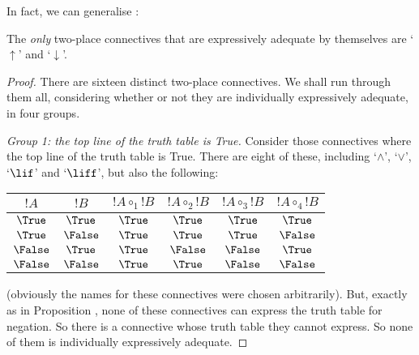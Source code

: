 \documentclass[../../../include/open-logic-section]{subfiles}
\begin{document}
In fact, we can generalise :
	\begin{thm}The \emph{only} two-place connectives that are expressively adequate by themselves are `$\uparrow$' and `$\downarrow$'. 
		\begin{proof}
			There are sixteen distinct two-place connectives. We shall run through them all, considering whether or not they are individually expressively adequate, in four groups. 
			
			\emph{Group 1: the top line of the truth table is True.} Consider those connectives where the top line of the truth table is True. There are eight of  these, including `$\land$', `$\lor$', `$\lif$' and `$\liff$', but also the following:
	\begin{center}
		\begin{tabular}{c c | c c c c}
		${!A}$ & ${!B}$ & ${!A} \mathrel{\circ_1} {!B}$ & ${!A} \mathrel{\circ_2} {!B}$ & ${!A} \mathrel{\circ_3} {!B}$ & ${!A} \mathrel{\circ_4} {!B}$\\
		\hline
			 $\True$  & $\True$  & $\True$  & $\True$  & $\True$  & $\True$  \\
			 $\True$  & $\False$ & $\True$  & $\True$  & $\True$  & $\False$ \\
			 $\False$ & $\True$  & $\True$  & $\False$ & $\False$ & $\True$  \\
			 $\False$ & $\False$ & $\True$  & $\True$  & $\False$ & $\False$
	\end{tabular}
	\end{center}
	(obviously the names for these connectives were chosen arbitrarily). But, exactly as in Proposition , none of these connectives can express the truth table for negation. So there is a connective whose truth table they cannot express. So none of them is individually expressively adequate.
				

\end{proof}
\end{thm}
\end{document}
